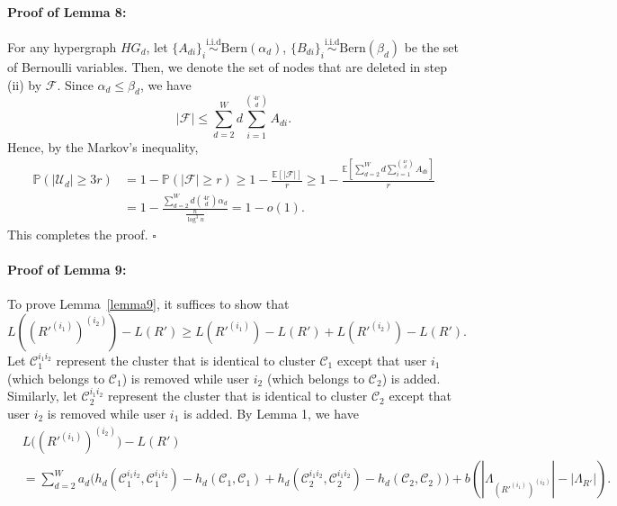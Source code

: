 \documentclass{article}
\newcommand\af{\alpha_d}
\newcommand\bt{\beta_d}
\begin{document}
\paragraph{Proof of Lemma 8:}
For any hypergraph $HG_d$, let $\{A_{di}\}_i \overset{\text{i.i.d}}{\sim} \text{Bern}(\alpha_d) $, $\{B_{di}\}_i \overset{\text{i.i.d}}{\sim} \text{Bern}(\beta_d)$  be the set of Bernoulli variables. Then, we denote the set of nodes that are deleted in step (ii) by $\mathcal{F}$. Since $\af \leq \bt$, we have 
$$|\mathcal{F}| \leq \sum_{d=2}^W  d \sum_{i=1}^{\binom{4r}{d}} A_{di}.$$
Hence, by the Markov’s inequality,
\begin{equation}\label{36}
\begin{aligned}
    \mathbb{P} \left( |\mathcal{U}_d| \geq 3r \right) &= 1- \mathbb{P} \left( |\mathcal{F}| \geq r \right) \geq 1- \frac{\mathbb{E}[|\mathcal{F}|]}{r} \geq 1- \frac{\mathbb{E}[ \sum_{d=2}^W d\sum_{i=1}^{\binom{4r}{d}} A_{di}]}{r} \\
    &= 1- \frac{\sum_{d=2}^W d\binom{4r}{d} \alpha_d}{\frac{n}{\log^3 n}} = 1-o(1).
\end{aligned}
\end{equation}
This completes the proof.
\hfill $\square$\par

 \paragraph{Proof of Lemma 9:} 
To prove Lemma~\ref{lemma9}, it suffices to show that 
$$L((R'^{(i_1)})^{(i_2)}) - L(R') \geq L(R'^{(i_1)}) - L(R') + L(R'^{(i_2)}) - L(R'). $$
Let $\mathcal{C}_1^{i_1 i_2}$ represent the cluster that is identical to cluster $\mathcal{C}_1$ except that user $i_1$ (which belongs to $\mathcal{C}_1$) is removed  while user $i_2$ (which belongs to $\mathcal{C}_2$) is added. Similarly,  let $\mathcal{C}_2^{i_1 i_2}$ represent the cluster that is identical to cluster $\mathcal{C}_2$ except that user $i_2$ is removed while user $i_1$ is added.  By Lemma 1, we have
    \begin{equation}
        \begin{aligned}
            &L\Big((R'^{(i_1)})^{(i_2)}\Big) - L(R') \\
            &= \sum_{d=2}^W a_d \Big( h_d( \mathcal{C}_1^{i_1i_2},  \mathcal{C}_1^{i_1i_2}) - h_d( \mathcal{C}_1, \mathcal{C}_1 ) + h_d( \mathcal{C}_2^{i_1i_2},  \mathcal{C}_2^{i_1i_2}) - h_d( \mathcal{C}_2, \mathcal{C}_2 ) \Big) + b ( |\Lambda_{(R'^{(i_1)})^{(i_2)}}| - |\Lambda_{R'}| ).
        \end{aligned}
    \end{equation}
    
\end{document}
